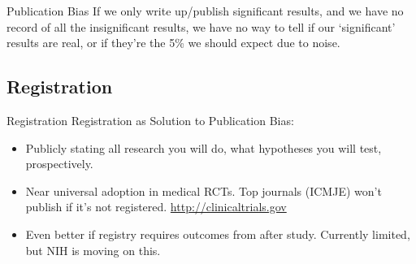 \documentclass{beamer}
\begin{document}
{ %
    \begin{frame}[plain]
     \end{frame}
}




\begin {frame}{Publication Bias}
If we only write up/publish significant results, and we have no record of all the insignificant results, we have no way to tell if our `significant' results are real, or if they're the 5\% we should expect due to noise.
\end{frame}

\subsection{Registration}
\begin{frame}{Registration}
Registration as Solution to Publication Bias:
 \begin{itemize}[<.->]
  \item
   Publicly stating all research you will do, what hypotheses you will test, prospectively.
  \item
   Near universal adoption in medical RCTs. Top journals (ICMJE) won't publish if it's not registered. \url{http://clinicaltrials.gov}
  \item
   Even better if registry requires outcomes from after study. Currently limited, but NIH is moving on this.
\end{itemize}
\end{frame}
\end{document}
